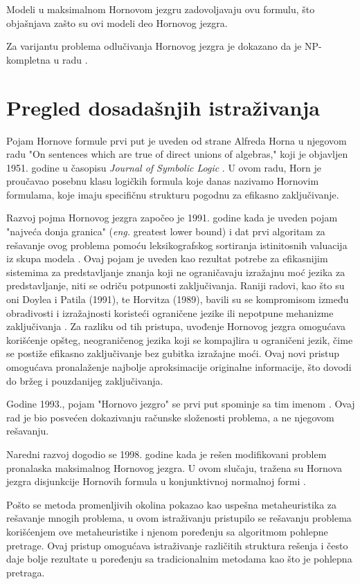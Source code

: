 \documentclass[12pt,oneside]{memoir}
\begin{document}
Modeli u maksimalnom Hornovom jezgru zadovoljavaju ovu formulu, što objašnjava zašto su ovi modeli deo Hornovog jezgra.

Za varijantu problema odlučivanja Hornovog jezgra je dokazano da je NP-kompletna u radu \cite{doc3}.

\section{Pregled dosadašnjih istraživanja}

Pojam Hornove formule prvi put je uveden od strane Alfreda Horna u njegovom radu "On sentences which are true of direct unions of algebras," koji je objavljen 1951. godine u časopisu \textit{Journal of Symbolic Logic} \cite{doc_horn_clause}. U ovom radu, Horn je proučavao posebnu klasu logičkih formula koje danas nazivamo Hornovim formulama, koje imaju specifičnu strukturu pogodnu za efikasno zaključivanje.

Razvoj pojma Hornovog jezgra započeo je 1991. godine kada je uveden pojam "najveća donja granica" (\textit{eng.} greatest lower bound) i dat prvi algoritam za rešavanje ovog problema pomoću leksikografskog sortiranja istinitosnih valuacija iz skupa modela \cite{doc2}. Ovaj pojam je uveden kao rezultat potrebe za efikasnijim sistemima za predstavljanje znanja koji ne ograničavaju izražajnu moć jezika za predstavljanje, niti se odriču potpunosti zaključivanja. Raniji radovi, kao što su oni Doylea i Patila (1991), te Horvitza (1989), bavili su se kompromisom između obradivosti i izražajnosti koristeći ograničene jezike ili nepotpune mehanizme zaključivanja \cite{doyle1991, horvitz1989}. Za razliku od tih pristupa, uvođenje Hornovog jezgra omogućava korišćenje opšteg, neograničenog jezika koji se kompajlira u ograničeni jezik, čime se postiže efikasno zaključivanje bez gubitka izražajne moći. Ovaj novi pristup omogućava pronalaženje najbolje aproksimacije originalne informacije, što dovodi do bržeg i pouzdanijeg zaključivanja.

Godine 1993., pojam "Hornovo jezgro" se prvi put spominje sa tim imenom \cite{doc3}. Ovaj rad je bio posvećen dokazivanju računske složenosti problema, a ne njegovom rešavanju.

Naredni razvoj dogodio se 1998. godine kada je rešen modifikovani problem pronalaska maksimalnog Hornovog jezgra. U ovom slučaju, tražena su Hornova jezgra disjunkcije Hornovih formula u konjunktivnoj normalnoj formi \cite{doc1}.

Pošto se metoda promenljivih okolina pokazao kao uspešna metaheuristika za rešavanje mnogih problema, u ovom istraživanju pristupilo se rešavanju problema korišćenjem ove metaheuristike i njenom poređenju sa algoritmom pohlepne pretrage. Ovaj pristup omogućava istraživanje različitih struktura rešenja i često daje bolje rezultate u poređenju sa tradicionalnim metodama kao što je pohlepna pretraga.
\end{document}
